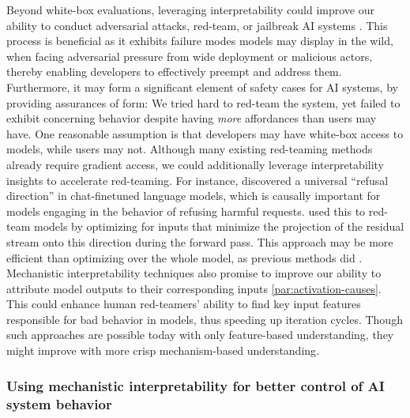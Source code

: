 Beyond white-box evaluations, leveraging interpretability could improve our ability to conduct adversarial attacks, red-team, or jailbreak AI systems \citep{Casper_2024}. This process is beneficial as it exhibits failure modes models may display in the wild, when facing adversarial pressure from wide deployment or malicious actors, thereby enabling developers to effectively preempt and address them. Furthermore, it may form a significant element of safety cases \citep{clymer2024safetycasesjustifysafety, balesni2024evaluationsbasedsafetycasesai,grosse2024three,goemans2024safetycasetemplatefrontier} for AI systems, by providing assurances of form: We tried hard to red-team the system, yet failed to exhibit concerning behavior despite having \textit{more} affordances than users may have. One reasonable assumption is that developers may have white-box access to models, while users may not. Although many existing red-teaming methods \citep{perez2022redteaminglanguagemodels,zou2023universaltransferableadversarialattacks} already require gradient access, we could additionally leverage interpretability insights to accelerate red-teaming. For instance, \citet{arditi2024refusallanguagemodelsmediated} discovered a universal “refusal direction” in chat-finetuned language models, which is causally important for models engaging in the behavior of refusing harmful requests. \citet{lin2024understandingjailbreakattacksllms} used this to red-team models by optimizing for inputs that minimize the projection of the residual stream onto this direction during the forward pass. This approach may be more efficient than optimizing over the whole model, as previous methods did \citep{zou2023universaltransferableadversarialattacks}. Mechanistic interpretability techniques also promise to improve our ability to attribute model outputs to their corresponding inputs \cref{par:activation-causes}. This could enhance human red-teamers' ability to find key input features responsible for bad behavior in models, thus speeding up iteration cycles. Though such approaches are possible today with only feature-based understanding, they might improve with more crisp mechanism-based understanding.

\subsubsection{Using mechanistic interpretability for better control of AI system behavior}
\label{subsec:better-control}

